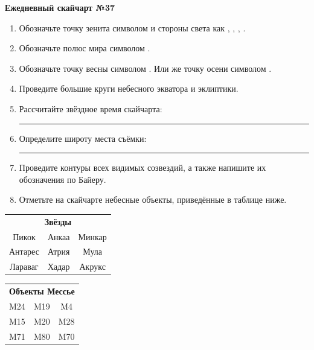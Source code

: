 \documentclass{./SAS-class-skygen}
\begin{document}
    
    
    
	\begin{center}
		\large\textbf{Ежедневный скайчарт №37}
	\end{center}

	\begin{enumerate}
		\item Обозначьте точку зенита символом  и стороны света как , , , .
		\item Обозначьте полюс мира символом .
		\item Обозначьте точку весны символом \Aries. Или же точку осени символом \Libra.
		\item Проведите большие круги небесного экватора и эклиптики.
		\item Рассчитайте звёздное время скайчарта: \rule{2cm}{0.4pt}
		\item Определите широту места съёмки: \rule{2cm}{0.4pt}
		\item Проведите контуры всех видимых созвездий, а также напишите их обозначения по Байеру.
		\item Отметьте на скайчарте небесные объекты, приведённые в таблице ниже.
	\end{enumerate}
	
    \vspace{0.5cm}

    \begin{table}[h!]
    \centering
    \begin{tabular}{ccc}
    \multicolumn{3}{c}{\textbf{Звёзды}} \\ Пикок & Анкаа & Минкар \\
Антарес & Атрия & Мула \\
Лараваг & Хадар & Акрукс \\

\end{tabular}
    \hfill
    \begin{tabular}{ccc}
    \multicolumn{3}{c}{\textbf{Объекты Мессье}} \\ M24 & M19 & M4 \\
M15 & M20 & M28 \\
M71 & M80 & M70 \\

\end{tabular}
    \end{table}
	
\end{document}
